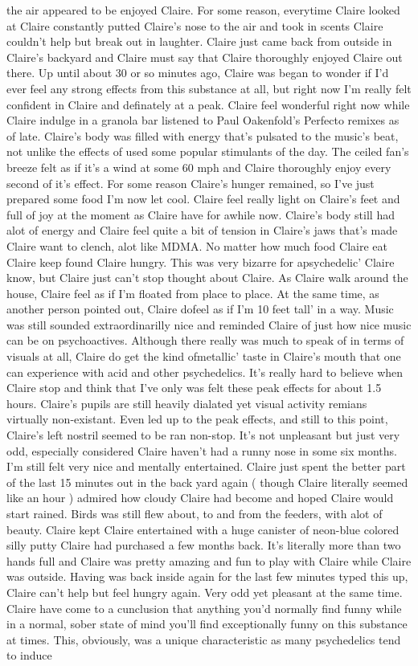 \documentclass[12pt]{book}
\begin{document}
the air appeared to be enjoyed Claire. For some reason, everytime Claire looked at Claire constantly putted Claire's nose to the air and took in scents Claire couldn't help but break out in laughter. Claire just came back from outside in Claire's backyard and Claire must say that Claire thoroughly enjoyed Claire out there. Up until about 30 or so minutes ago, Claire was began to wonder if I'd ever feel any strong effects from this substance at all, but right now I'm really felt confident in Claire and definately at a peak. Claire feel wonderful right now while Claire indulge in a granola bar listened to Paul Oakenfold's Perfecto remixes as of late. Claire's body was filled with energy that's pulsated to the music's beat, not unlike the effects of used some popular stimulants of the day. The ceiled fan's breeze felt as if it's a wind at some 60 mph and Claire thoroughly enjoy every second of it's effect. For some reason Claire's hunger remained, so I've just prepared some food I'm now let cool. Claire feel really light on Claire's feet and full of joy at the moment as Claire have for awhile now. Claire's body still had alot of energy and Claire feel quite a bit of tension in Claire's jaws that's made Claire want to clench, alot like MDMA. No matter how much food Claire eat Claire keep found Claire hungry. This was very bizarre for apsychedelic' Claire know, but Claire just can't stop thought about Claire. As Claire walk around the house, Claire feel as if I'm floated from place to place. At the same time, as another person pointed out, Claire dofeel as if I'm 10 feet tall' in a way. Music was still sounded extraordinarilly nice and reminded Claire of just how nice music can be on psychoactives. Although there really was much to speak of in terms of visuals at all, Claire do get the kind ofmetallic' taste in Claire's mouth that one can experience with acid and other psychedelics. It's really hard to believe when Claire stop and think that I've only was felt these peak effects for about 1.5 hours. Claire's pupils are still heavily dialated yet visual activity remians virtually non-existant. Even led up to the peak effects, and still to this point, Claire's left nostril seemed to be ran non-stop. It's not unpleasant but just very odd, especially considered Claire haven't had a runny nose in some six months. I'm still felt very nice and mentally entertained. Claire just spent the better part of the last 15 minutes out in the back yard again ( though Claire literally seemed like an hour ) admired how cloudy Claire had become and hoped Claire would start rained. Birds was still flew about, to and from the feeders, with alot of beauty. Claire kept Claire entertained with a huge canister of neon-blue colored silly putty Claire had purchased a few months back. It's literally more than two hands full and Claire was pretty amazing and fun to play with Claire while Claire was outside. Having was back inside again for the last few minutes typed this up, Claire can't help but feel hungry again. Very odd yet pleasant at the same time. Claire have come to a cunclusion that anything you'd normally find funny while in a normal, sober state of mind you'll find exceptionally funny on this substance at times. This, obviously, was a unique characteristic as many psychedelics tend to induce 
\end{document}
